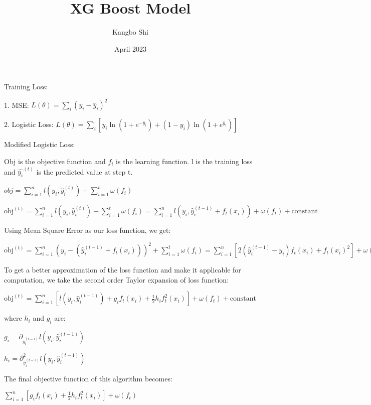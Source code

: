 \documentclass{article}
\title{XG Boost Model}
\author{Kangbo Shi}
\date{April 2023}
\theoremstyle{definition}
\begin{document}
\maketitle

Training Loss:

1. MSE: $\displaystyle L(\theta) = \sum_i (y_i-\hat{y}_i)^2$

2. Logistic Loss: $\displaystyle L(\theta) = \sum_i [y_i\ln(1+e^{-\hat{y}_i})+(1-y_i)\ln(1+e^{\hat{y}_i})]$

\bigskip

\bigskip

Modified Logistic Loss:

Obj is the objective function and $f_i$ is the learning function. l is the training loss and $\hat{y_i}^{(t)}$ is the predicted value at step t.

$\displaystyle obj = \sum^n_{i=1} l(y_i, \hat{y}_i^{(t)})+\sum^t_{i=1}\omega (f_i)$

$\displaystyle \text{obj}^{(t)}  = \sum_{i=1}^n l(y_i, \hat{y}_i^{(t)}) + \sum_{i=1}^t\omega(f_i) = \sum_{i=1}^n l(y_i, \hat{y}_i^{(t-1)} + f_t(x_i)) + \omega(f_t) + \mathrm{constant}$

Using Mean Square Error as our loss function, we get:

$\displaystyle \text{obj}^{(t)} = \sum_{i=1}^n (y_i - (\hat{y}_i^{(t-1)} + f_t(x_i)))^2 + \sum_{i=1}^t\omega(f_i) = \sum_{i=1}^n [2(\hat{y}_i^{(t-1)} - y_i)f_t(x_i) + f_t(x_i)^2] + \omega(f_t) + \mathrm{constant}$

To get a better approximation of the loss function and make it applicable for computation, we take the second order Taylor expansion of loss function:

$\text{obj}^{(t)} = \sum_{i=1}^n [l(y_i, \hat{y}_i^{(t-1)}) + g_i f_t(x_i) + \frac{1}{2} h_i f_t^2(x_i)] + \omega(f_t) + \mathrm{constant}$

where $h_i$ and $g_i$ are: 

$g_i = \partial_{\hat{y}_i^{(t-1)}} l(y_i, \hat{y}_i^{(t-1)})$

$h_i = \partial_{\hat{y}_i^{(t-1)}}^2 l(y_i, \hat{y}_i^{(t-1)})$

The final objective function of this algorithm becomes:

$\sum_{i=1}^n [g_i f_t(x_i) + \frac{1}{2} h_i f_t^2(x_i)] + \omega(f_t)$
\end{document}

